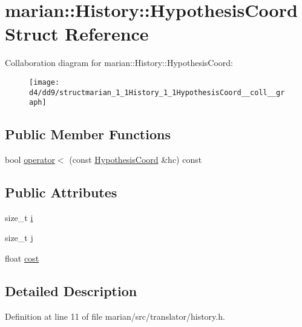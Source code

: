 \hypertarget{structmarian_1_1History_1_1HypothesisCoord}{}\section{marian\+:\+:History\+:\+:Hypothesis\+Coord Struct Reference}
\label{structmarian_1_1History_1_1HypothesisCoord}


Collaboration diagram for marian\+:\+:History\+:\+:Hypothesis\+Coord\+:
\nopagebreak
\begin{figure}[H]
\begin{center}
\leavevmode
\texttt{[image: d4/dd9/structmarian\_1\_1History\_1\_1HypothesisCoord\_\_coll\_\_graph]}
\end{center}
\end{figure}
\subsection*{Public Member Functions}
\begin{DoxyCompactItemize}
\item 
bool \hyperlink{structmarian_1_1History_1_1HypothesisCoord_a0a75885db6d52a53a217182793d0705a}{operator$<$} (const \hyperlink{structmarian_1_1History_1_1HypothesisCoord}{Hypothesis\+Coord} \&hc) const 
\end{DoxyCompactItemize}
\subsection*{Public Attributes}
\begin{DoxyCompactItemize}
\item 
size\+\_\+t \hyperlink{structmarian_1_1History_1_1HypothesisCoord_a9ff840788af2130487c37489a6b44e00}{i}
\item 
size\+\_\+t \hyperlink{structmarian_1_1History_1_1HypothesisCoord_a90222589cdb4675bc2fa5c22232be6e7}{j}
\item 
float \hyperlink{structmarian_1_1History_1_1HypothesisCoord_a7cefab6718aaf28c3df585c009e6b03d}{cost}
\end{DoxyCompactItemize}


\subsection{Detailed Description}


Definition at line 11 of file marian/src/translator/history.\+h.



